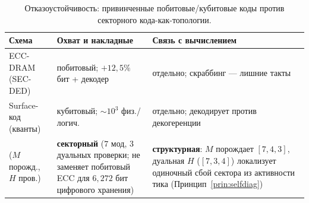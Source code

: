 \begin{table}[H]
\centering\small
\caption{Отказоустойчивость: привинченные побитовые/кубитовые коды против секторного кода-как-топологии.}
\label{tab:ecc}
\begin{tabular}{@{}p{3.6cm}p{3.4cm}p{4.7cm}@{}}
\toprule
\textbf{Схема} & \textbf{Охват и накладные} & \textbf{Связь с вычислением} \\
\midrule
ECC-DRAM (SEC-DED) & побитовый; $+12{,}5\%$ бит + декодер & отдельно; скраббинг --- лишние такты \\
Surface-код (кванты) & кубитовый; $\sim\!10^3$ физ./логич. & отдельно; декодирует против декогеренции \\
\TALOS{} ($M$ порожд., $H$ пров.) & \textbf{секторный} ($7$ мод, $3$ дуальных проверки; не заменяет побитовый ECC для $6{,}272$ бит цифрового хранения) & \textbf{структурная}: $M$ порождает $[7,4,3]$, дуальная $H$ ($[7,3,4]$) локализует одиночный сбой сектора из активности тика (Принцип~\ref{prin:selfdiag}) \\
\bottomrule
\end{tabular}
\end{table}
